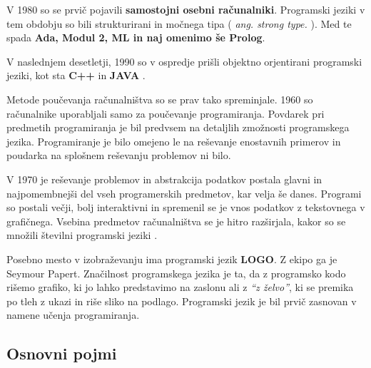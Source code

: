 V 1980 so se prvič pojavili \textbf{samostojni osebni računalniki}. Programski
jeziki v tem obdobju so bili strukturirani in močnega tipa (
\emph{ang.  strong type.} ). Med te spada \textbf{Ada, Modul 2, ML in
  naj omenimo še Prolog}.

V naslednjem desetletji, 1990 so v ospredje prišli objektno
orjentirani programski jeziki, kot sta \textbf{C++} in \textbf{JAVA}
\cite{thesisAWebP}.





Metode poučevanja računalništva so se prav tako spreminjale. 1960 so
računalnike uporabljali samo za poučevanje programiranja. Povdarek pri
predmetih programiranja je bil predvsem na detaljlih zmožnosti
programskega jezika. Programiranje je bilo omejeno le na reševanje
enostavnih primerov in poudarka na splošnem reševanju problemov ni
bilo.

V 1970 je reševanje problemov in abstrakcija podatkov postala glavni
in najpomembnejši del vseh programerskih predmetov, kar velja še
danes. Programi so postali večji, bolj interaktivni in spremenil se
je vnos podatkov z tekstovnega v grafičnega. Vsebina predmetov
računalništva se je hitro razširjala, kakor so se množili številni
programski jeziki \cite{thesisAWebP}.

Posebno mesto v izobraževanju ima programski jezik
\textbf{LOGO}. Z ekipo ga je Seymour Papert. Značilnost programskega
jezika je ta, da z programsko kodo rišemo grafiko, ki jo lahko
predstavimo na zaslonu ali z \emph{``z želvo''}, ki se premika po tleh
z ukazi in riše sliko na podlago. Programski jezik je bil prvič
zasnovan v namene učenja programiranja.



 
\subsection{Osnovni pojmi}
\label{sec:kaj_je_programiranje}

